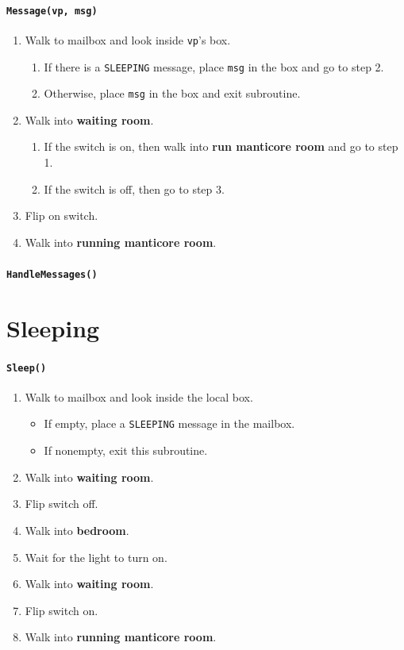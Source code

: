 \documentclass[11pt]{article}
\begin{document}
\paragraph{\texttt{Message(vp, msg)}}
\begin{enumerate}
  \item Walk to mailbox and look inside \texttt{vp}'s box.
    \begin{enumerate}
      \item If there is a \texttt{SLEEPING} message, place \texttt{msg} in the box and go to step 2.
      \item Otherwise, place \texttt{msg} in the box and exit subroutine.
    \end{enumerate}
  \item Walk into \textbf{waiting room}.
    \begin{enumerate}
      \item If the switch is on, then walk into \textbf{run manticore room} and go to step 1.
      \item If the switch is off, then go to step 3.
    \end{enumerate}
  \item Flip on switch.
  \item Walk into \textbf{running manticore room}.
\end{enumerate}

\paragraph{\texttt{HandleMessages()}}

\section{Sleeping}

\paragraph{\texttt{Sleep()}}
\begin{enumerate}
  \item Walk to mailbox and look inside the local box.
    \begin{itemize}
      \item If empty, place a \texttt{SLEEPING} message in the mailbox.
      \item If nonempty, exit this subroutine.
    \end{itemize}
  \item Walk into \textbf{waiting room}.
  \item Flip switch off.
  \item Walk into \textbf{bedroom}.
  \item Wait for the light to turn on.
  \item Walk into \textbf{waiting room}.
  \item Flip switch on.
  \item Walk into \textbf{running manticore room}.
\end{enumerate}
\end{document}
